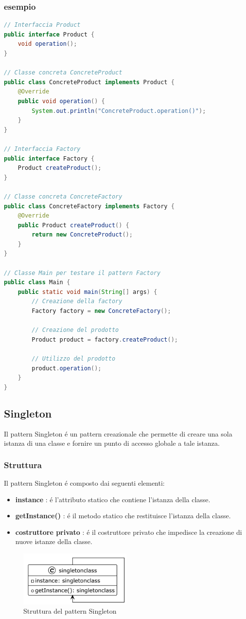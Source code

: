 \documentclass[11pt]{article}
\begin{document}
\subsubsection{esempio}
\begin{lstlisting}[language=Java]
// Interfaccia Product
public interface Product {
    void operation();
}

// Classe concreta ConcreteProduct
public class ConcreteProduct implements Product {
    @Override
    public void operation() {
        System.out.println("ConcreteProduct.operation()");
    }
}

// Interfaccia Factory
public interface Factory {
    Product createProduct();
}

// Classe concreta ConcreteFactory
public class ConcreteFactory implements Factory {
    @Override
    public Product createProduct() {
        return new ConcreteProduct();
    }
}

// Classe Main per testare il pattern Factory
public class Main {
    public static void main(String[] args) {
        // Creazione della factory
        Factory factory = new ConcreteFactory();

        // Creazione del prodotto
        Product product = factory.createProduct();

        // Utilizzo del prodotto
        product.operation();
    }
}
\end{lstlisting}
\subsection{Singleton}
Il pattern Singleton é un pattern creazionale che permette di creare una sola istanza di una classe e fornire un punto di accesso globale a tale istanza.
\subsubsection{Struttura}
Il pattern Singleton é composto dai seguenti elementi:
\begin{itemize}
    \item \textbf{instance} : é l'attributo statico che contiene l'istanza della classe.
    \item \textbf{getInstance()} : é il metodo statico che restituisce l'istanza della classe.
    \item \textbf{costruttore privato} : é il costruttore privato che impedisce la creazione di nuove istanze della classe.
    \end{itemize}
\begin{figure}[H]
    \centering
    \includegraphics[width=0.5\textwidth]{singletonclass}
    \caption{Struttura del pattern Singleton}
\end{figure}
\end{document}

